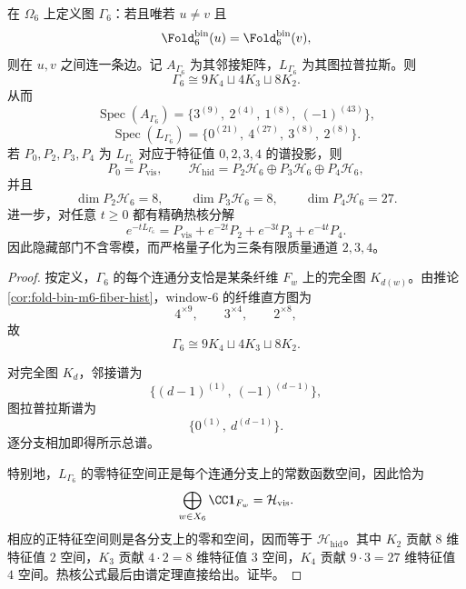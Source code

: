 \begin{theorem}[同纤维团图的质量量子化与热核三指数分解]\label{thm:xi-time-part55d-window6-fiber-clique-mass-quantization}
在 \(\Omega_6\) 上定义图 \(\Gamma_6\)：若且唯若 \(u\neq v\) 且
\[
\Fold_6^{\mathrm{bin}}(u)=\Fold_6^{\mathrm{bin}}(v),
\]
则在 \(u,v\) 之间连一条边。记 \(A_{\Gamma_6}\) 为其邻接矩阵，\(L_{\Gamma_6}\) 为其图拉普拉斯。则
\[
\Gamma_6\cong 9K_4\sqcup 4K_3\sqcup 8K_2.
\]
从而
\[
\operatorname{Spec}(A_{\Gamma_6})
=
\{3^{(9)},\ 2^{(4)},\ 1^{(8)},\ (-1)^{(43)}\},
\]
\[
\operatorname{Spec}(L_{\Gamma_6})
=
\{0^{(21)},\ 4^{(27)},\ 3^{(8)},\ 2^{(8)}\}.
\]
若 \(P_0,P_2,P_3,P_4\) 为 \(L_{\Gamma_6}\) 对应于特征值 \(0,2,3,4\) 的谱投影，则
\[
P_0=P_{\mathrm{vis}},
\qquad
\mathcal H_{\mathrm{hid}}
=
P_2\mathcal H_6\oplus P_3\mathcal H_6\oplus P_4\mathcal H_6,
\]
并且
\[
\dim P_2\mathcal H_6=8,
\qquad
\dim P_3\mathcal H_6=8,
\qquad
\dim P_4\mathcal H_6=27.
\]
进一步，对任意 \(t\ge 0\) 都有精确热核分解
\[
e^{-tL_{\Gamma_6}}
=
P_{\mathrm{vis}}
+
e^{-2t}P_2
+
e^{-3t}P_3
+
e^{-4t}P_4.
\]
因此隐藏部门不含零模，而严格量子化为三条有限质量通道 \(2,3,4\)。
\end{theorem}
\begin{proof}
按定义，\(\Gamma_6\) 的每个连通分支恰是某条纤维 \(F_w\) 上的完全图 \(K_{d(w)}\)。由推论 \ref{cor:fold-bin-m6-fiber-hist}，window-\(6\) 的纤维直方图为
\[
4^{\times 9},\qquad 3^{\times 4},\qquad 2^{\times 8},
\]
故
\[
\Gamma_6\cong 9K_4\sqcup 4K_3\sqcup 8K_2.
\]

对完全图 \(K_d\)，邻接谱为
\[
\{(d-1)^{(1)},\ (-1)^{(d-1)}\},
\]
图拉普拉斯谱为
\[
\{0^{(1)},\ d^{(d-1)}\}.
\]
逐分支相加即得所示总谱。

特别地，\(L_{\Gamma_6}\) 的零特征空间正是每个连通分支上的常数函数空间，因此恰为
\[
\bigoplus_{w\in X_6}\CC \mathbf 1_{F_w}
=
\mathcal H_{\mathrm{vis}}.
\]
相应的正特征空间则是各分支上的零和空间，因而等于 \(\mathcal H_{\mathrm{hid}}\)。其中 \(K_2\) 贡献 \(8\) 维特征值 \(2\) 空间，\(K_3\) 贡献 \(4\cdot 2=8\) 维特征值 \(3\) 空间，\(K_4\) 贡献 \(9\cdot 3=27\) 维特征值 \(4\) 空间。热核公式最后由谱定理直接给出。证毕。
\end{proof}

